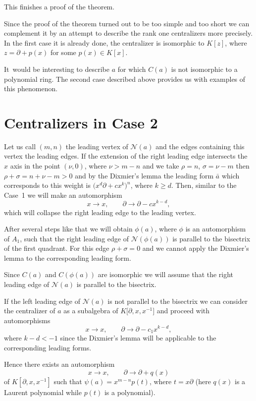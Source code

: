 \documentclass[10pt,a4paper]{amsart}
\numberwithin{equation}{section}
\newcommand{\de}{\partial}
\newcommand{\si}{\sigma}
\begin{document}
This finishes a proof of the theorem.



Since the proof of the theorem turned out to be too simple and too short we can
complement it by an attempt to describe the rank one centralizers more
precisely. In the first case it is already done, the centralizer is isomorphic
to $K[z]$, where $z = \de + p(x)$ for some $p(x) \in K[x]$.

It~would be interesting to describe $a$ for which $C(a)$ is not isomorphic to a polynomial ring. The second case described above provides us with examples of this phenomenon.

\section{Centralizers in Case 2}\label{lie}

Let us call $(m,n)$ the leading vertex of ${\mathcal N}(a)$ and the edges containing this vertex the leading edges. If the extension of the right leading edge intersects the $x$ axis in the point $(\nu, 0)$,
where $\nu > m - n$ and we take $\rho = n$, $\si = \nu - m$ then $\rho + \si = n + \nu - m > 0$ and by the Dixmier's lemma the leading form $\bar{a}$ which corresponds to this weight is $\big(x^d\de + c x^k\big)^n$, where $k \geq d$. Then, similar to the Case~1 we will make an automorphism
\[
x \to x, \qquad\de \to \de - cx^{k-d},
\]
which will collapse the right leading edge to the leading vertex.

After several steps like that we will obtain $\phi(a)$, where $\phi$ is an automorphism of $A_1$, such that the right leading edge of ${\mathcal N}(\phi(a))$ is parallel to the bisectrix of the first quadrant. For this edge $\rho + \si = 0$ and we cannot apply the Dixmier's lemma to the corresponding leading form.

Since $C(a)$ and $C(\phi(a))$ are isomorphic we will assume that the right leading edge of ${\mathcal N}(a)$ is parallel to the bisectrix.

If the left leading edge of ${\mathcal N}(a)$ is not parallel to the bisectrix we can consider the centralizer of $a$ as a subalgebra of $K\big[\de, x, x^{-1}\big]$ and proceed with automorphisms
\[
x \rightarrow x,\qquad
\de \rightarrow \de - c_1x^{k-d},
\]
where $k - d < -1$ since the Dixmier's lemma will be applicable to the corresponding leading forms.

Hence there exists an automorphism
\[
x \rightarrow x, \qquad
\de \rightarrow
\de + q(x)
\]
of $K[\de, x, x^{-1}]$
such that $\psi(a) = x^{m-n}p(t)$, where $t =
x\de$ (here $q(x)$ is a Laurent polynomial while $p(t)$ is a polynomial).
\end{document}
